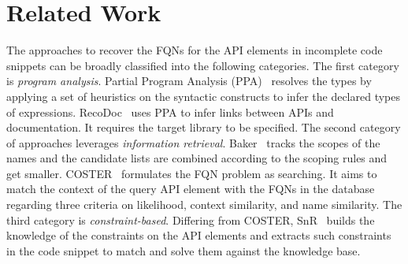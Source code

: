 \section{Related Work}
\label{sec:related}

The approaches to recover the FQNs for the API elements in incomplete
code snippets can be broadly classified into the following categories.
The first category is {\em program analysis}. Partial Program Analysis
(PPA)~\cite{dagenais-oopsla08} resolves the types by applying a set of
heuristics on the syntactic constructs to infer the declared types of
expressions. RecoDoc~\cite{dagenais-icse12} uses PPA to infer links
between APIs and documentation. It requires the target library to be
specified. The second category of approaches leverages {\em
  information retrieval}. Baker~\cite{liveapi14} tracks the scopes of
the names and the candidate lists are combined according to the
scoping rules and get smaller. COSTER~\cite{coster-ase19} formulates
the FQN problem as searching. It aims to match the context of the
query API element with the FQNs in the database regarding three
criteria on likelihood, context similarity, and name similarity.
The third category is {\em constraint-based}. Differing from COSTER,
SnR~\cite{snr-icse22} builds the knowledge of the constraints on
the API elements and extracts such constraints in the code snippet
to match and solve them against the knowledge base.

